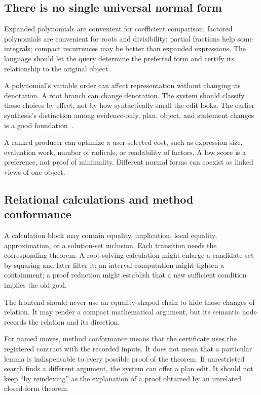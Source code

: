 \documentclass[11pt,a4paper]{article}
\theoremstyle{definition}
\begin{document}
\subsection{There is no single universal normal form}
Expanded polynomials are convenient for coefficient comparison; factored polynomials are convenient for roots and divisibility; partial fractions help some integrals; compact recurrences may be better than expanded expressions. The language should let the query determine the preferred form and certify its relationship to the original object.

A polynomial's variable order can affect representation without changing its denotation. A root branch can change denotation. The system should classify those choices by effect, not by how syntactically small the edit looks. The earlier synthesis's distinction among evidence-only, plan, object, and statement changes is a good foundation~\cite{synA}.

A ranked producer can optimize a user-selected cost, such as expression size, evaluation work, number of radicals, or readability of factors. A low score is a preference, not proof of minimality. Different normal forms can coexist as linked views of one object.

\subsection{Relational calculations and method conformance}
A calculation block may contain equality, implication, local equality, approximation, or a solution-set inclusion. Each transition needs the corresponding theorem. A root-solving calculation might enlarge a candidate set by squaring and later filter it; an interval computation might tighten a containment; a proof reduction might establish that a new sufficient condition implies the old goal.

The frontend should never use an equality-shaped chain to hide those changes of relation. It may render a compact mathematical argument, but its semantic node records the relation and its direction.

For named moves, method conformance means that the certificate uses the registered contract with the recorded inputs. It does not mean that a particular lemma is indispensable to every possible proof of the theorem. If unrestricted search finds a different argument, the system can offer a plan edit. It should not keep ``by reindexing'' as the explanation of a proof obtained by an unrelated closed-form theorem.
\end{document}
